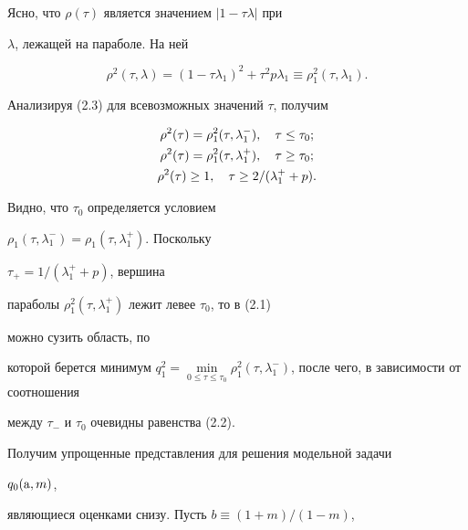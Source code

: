\begin{pf} 


Ясно, что $\rho(\tau)$ является значением $|1-\tau\lambda|$ при 


$\lambda$, лежащей на параболе. На ней 


\begin{equation} 


\rho^2(\tau,\lambda)=(1-\tau\lambda_1)^2+\tau^2p\lambda_1\equiv 


\rho^2_1(\tau,\lambda_1). 


\end{equation} 


Анализируя (2.3) для всевозможных значений $\tau$, получим 


\begin{gather} 


\rho^2(\tau)=\rho^2_1(\tau,\lambda^-_1),\quad \tau\le\tau_0;\notag\\ 


% 


\rho^2(\tau)=\rho^2_1(\tau,\lambda^+_1),\quad \tau\ge\tau_0;\\ 


% 


\rho^2(\tau)\ge1,\quad \tau\ge2/(\lambda^+_1+p). \notag


\end{gather} 


Видно, что $\tau_0$ определяется условием 


$\rho_1(\tau,\lambda^-_1)=\rho_1(\tau,\lambda^+_1)$. Поскольку 


$\tau_+=1/(\lambda^+_1+p)$, вершина 


параболы $\rho^2_1(\tau,\lambda^+_1)$ лежит левее $\tau_0$, то в (2.1) 


можно сузить область, по 


которой берется минимум $q^2_1=\min\limits_{0\le\tau\le\tau_0} 


\rho^2_1(\tau,\lambda^-_1)$, после чего, в зависимости от соотношения 


между $\tau_-$ и $\tau_0$ очевидны равенства (2.2). 


\end{pf} 


 


Получим упрощенные представления для решения модельной задачи 


$q_0(\mathrm a,m)$, 


являющиеся оценками снизу. Пусть $b\equiv(1+m)/(1-m)$, 


